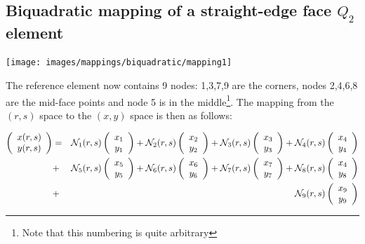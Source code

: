 \subsection{Biquadratic mapping of a straight-edge face $Q_2$ element }

\begin{center}
\texttt{[image: images/mappings/biquadratic/mapping1]}
\end{center}

The reference element now contains 9 nodes: 1,3,7,9 are the corners, nodes
2,4,6,8 are the mid-face points and node 5 is in the middle\footnote{Note that 
this numbering is quite arbitrary}.
The mapping from the $(r,s)$ space to the $(x,y)$ space is then as follows:

\begin{eqnarray}
\left(
\begin{array}{c}
x(r,s) \\ y(r,s)
\end{array}
\right)
&=&
{\mathcal{N}}_1(r,s)
\left(
\begin{array}{c}
x_1 \\ y_1
\end{array}
\right)
+
{\mathcal{N}}_2(r,s)
\left(
\begin{array}{c}
x_2 \\ y_2
\end{array}
\right)
+
{\mathcal{N}}_3(r,s)
\left(
\begin{array}{c}
x_3 \\ y_3
\end{array}
\right)
+
{\mathcal{N}}_4(r,s)
\left(
\begin{array}{c}
x_4 \\ y_4
\end{array}
\right) \nonumber\\
&+&
{\mathcal{N}}_5(r,s)
\left(
\begin{array}{c}
x_5 \\ y_5
\end{array}
\right)
+
{\mathcal{N}}_6(r,s)
\left(
\begin{array}{c}
x_6 \\ y_6
\end{array}
\right)
+
{\mathcal{N}}_7(r,s)
\left(
\begin{array}{c}
x_7 \\ y_7
\end{array}
\right)
+
{\mathcal{N}}_8(r,s)
\left(
\begin{array}{c}
x_4 \\ y_8
\end{array}
\right) \nonumber\\
&+&
{\mathcal{N}}_9(r,s)
\left(
\begin{array}{c}
x_9 \\ y_9
\end{array}
\right) 
\nonumber
\end{eqnarray}
